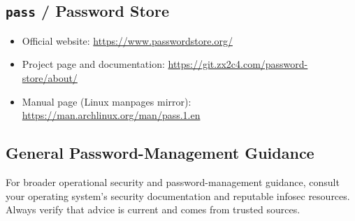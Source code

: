 \documentclass[11pt,a4paper]{article}
\begin{document}
\subsection{\texttt{pass} / Password Store}

\begin{itemize}[noitemsep]
  \item Official website: \url{https://www.passwordstore.org/}
  \item Project page and documentation: \url{https://git.zx2c4.com/password-store/about/}
  \item Manual page (Linux manpages mirror): \url{https://man.archlinux.org/man/pass.1.en}
\end{itemize}

\subsection{General Password-Management Guidance}

For broader operational security and password-management guidance, consult your operating system's security documentation and reputable infosec resources. Always verify that advice is current and comes from trusted sources.
\end{document}
